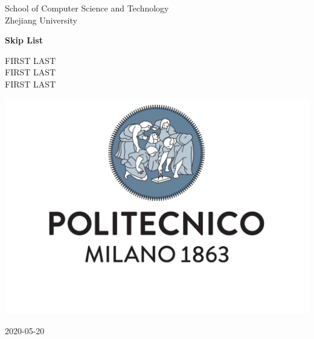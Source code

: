 \documentclass[10pt,english, openany]{book}
\begin{document}

\begin{titlepage}
	\clearpage\thispagestyle{empty}
	\centering
	\vspace{1cm}

	{\normalsize School of Computer Science and Technology \\ 
	Zhejiang University \par}
		\vspace{3cm}
	{\Huge \textbf{Skip List}} \\
	\vspace{4cm}
	{\normalsize FIRST LAST \\ %
	             FIRST LAST \\
	             FIRST LAST\par}
	\vspace{5cm}
    
    \centering \includegraphics[scale=0.4]{logo1.pdf}
    
    \vspace{0.5cm}
		
	{\normalsize 2020-05-20 \par}
	
	\pagebreak

\end{titlepage}
\end{document}
